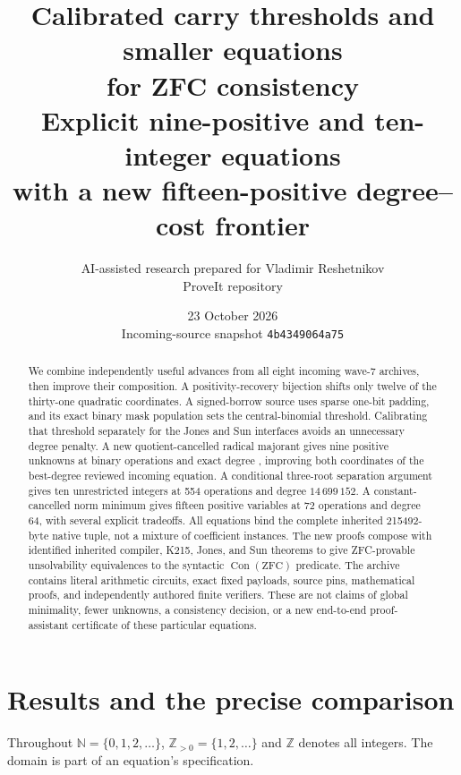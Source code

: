 \documentclass[11pt]{article}
\title{Calibrated carry thresholds and smaller equations\\for ZFC consistency\\[0.5em]\large Explicit nine-positive and ten-integer equations\\with a new fifteen-positive degree--cost frontier}
\author{AI-assisted research prepared for Vladimir Reshetnikov\\ProveIt repository}
\date{23 October 2026\\\small Incoming-source snapshot \texttt{4b4349064a75}}
\newcommand{\N}{\mathbb N}\newcommand{\Z}{\mathbb Z}
\newcommand{\Pos}{\mathbb Z_{>0}}\newcommand{\Con}{\operatorname{Con}}
\begin{document}
\maketitle
\begin{abstract}
We combine independently useful advances from all eight incoming wave-7
archives, then improve their composition. A positivity-recovery bijection
shifts only twelve of the thirty-one quadratic coordinates. A signed-borrow
source uses sparse one-bit padding, and its exact binary mask population
sets the central-binomial threshold. Calibrating that threshold separately
for the Jones and Sun interfaces avoids an unnecessary degree penalty.
A new quotient-cancelled radical majorant gives nine positive unknowns at
\NineOps{} binary operations and exact degree \NineDegree{}, improving
both coordinates of the best-degree reviewed incoming equation. A
conditional three-root separation argument gives ten unrestricted integers
at 554 operations and degree $14\,699\,152$. A constant-cancelled norm
minimum gives fifteen positive variables at 72 operations and degree 64,
with several explicit tradeoffs. All equations bind the complete inherited
215492-byte native tuple, not a mixture of coefficient instances.
The new proofs compose with identified inherited compiler, K215, Jones,
and Sun theorems to give ZFC-provable unsolvability equivalences to the
syntactic $\Con(\mathrm{ZFC})$ predicate. The archive contains literal
arithmetic circuits, exact fixed payloads, source pins, mathematical proofs,
and independently authored finite verifiers. These are not claims of global
minimality, fewer unknowns, a consistency decision, or a new end-to-end
proof-assistant certificate of these particular equations.
\end{abstract}
\tableofcontents
\newpage

\section{Results and the precise comparison}
Throughout $\N=\{0,1,2,\ldots\}$, $\Pos=\{1,2,\ldots\}$ and $\Z$ denotes
all integers. The domain is part of an equation's specification.
\end{document}
